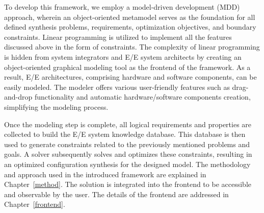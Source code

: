 	    
        To develop this framework, we employ a model-driven development (MDD) approach, wherein an object-oriented metamodel serves as the foundation for all defined synthesis problems, requirements, optimization objectives, and boundary constraints. Linear programming is utilized to implement all the features discussed above in the form of constraints. The complexity of linear programming is hidden from system integrators and E/E system architects by creating an object-oriented graphical modeling tool as the frontend of the framework. As a result, E/E architectures, comprising hardware and software components, can be easily modeled. The modeler offers various user-friendly features such as drag-and-drop functionality and automatic hardware/software components creation, simplifying the modeling process.
	    
	    
	    
	    
	    
	    Once the modeling step is complete, all logical requirements and properties are collected to build the E/E system knowledge database. This database is then used to generate constraints related to the previously mentioned problems and goals. A solver subsequently solves and optimizes these constraints, resulting in an optimized configuration synthesis for the designed model. The methodology and approach used in the introduced framework are explained in Chapter~\ref{method}.
	    The solution is integrated into the frontend to be accessible and observable by the user. The details of the frontend are addressed in Chapter~\ref{frontend}.
	    
	    
	
